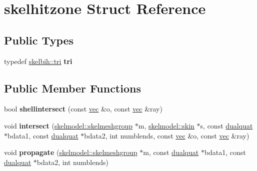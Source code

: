 \hypertarget{structskelhitzone}{}\section{skelhitzone Struct Reference}
\label{structskelhitzone}
\subsection*{Public Types}
\begin{DoxyCompactItemize}
\item 
\mbox{\label{structskelhitzone_a73f26cc07172f6c5a290318300dd0c6c}} 
typedef \hyperlink{structskelbih_1_1tri}{skelbih\+::tri} {\bfseries tri}
\end{DoxyCompactItemize}
\subsection*{Public Member Functions}
\begin{DoxyCompactItemize}
\item 
\mbox{\label{structskelhitzone_a6eeeec40231fb119e498308c66b239c7}} 
bool {\bfseries shellintersect} (const \hyperlink{structvec}{vec} \&o, const \hyperlink{structvec}{vec} \&ray)
\item 
\mbox{\label{structskelhitzone_a5f4680b14b6e1aa0e9b9fd144cf18c02}} 
void {\bfseries intersect} (\hyperlink{structskelmodel_1_1skelmeshgroup}{skelmodel\+::skelmeshgroup} $\ast$m, \hyperlink{structanimmodel_1_1skin}{skelmodel\+::skin} $\ast$s, const \hyperlink{structdualquat}{dualquat} $\ast$bdata1, const \hyperlink{structdualquat}{dualquat} $\ast$bdata2, int numblends, const \hyperlink{structvec}{vec} \&o, const \hyperlink{structvec}{vec} \&ray)
\item 
\mbox{\label{structskelhitzone_a03681353508c6a700e756f2c3ac09161}} 
void {\bfseries propagate} (\hyperlink{structskelmodel_1_1skelmeshgroup}{skelmodel\+::skelmeshgroup} $\ast$m, const \hyperlink{structdualquat}{dualquat} $\ast$bdata1, const \hyperlink{structdualquat}{dualquat} $\ast$bdata2, int numblends)
\end{DoxyCompactItemize}
